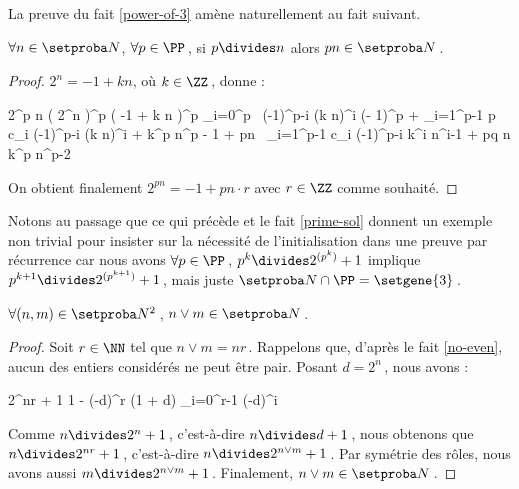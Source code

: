 La preuve du fait \ref{power-of-3} amène naturellement au fait suivant.

\begin{fact} \label{prime-divisor}
	$\forall n \in \ourset$, $\forall p \in \PP$\,,
	si $p \divides n$ alors $p n \in \ourset$\,.
\end{fact}

\begin{proof}
	$2^n = -1 + k n$, où $k \in \ZZ$\,, donne :

    \medskip
    
    \begin{stepcalc}[style=sar]
    	2^{p n}
    \explnext{}
    	\big( 2^n \big)^p
    \explnext{}
    	\big( -1 + k n \big)^p
    \explnext{}
    	\dsum_{i=0}^p  \, (-1)^{p-i} \cdot (k n)^i
    	(- 1)^p + \dsum_{i=1}^{p-1} p c_i \cdot (-1)^{p-i} \cdot (k n)^i + k^p \cdot n^p
    	- 1 + pn \, \dsum_{i=1}^{p-1} c_i \cdot (-1)^{p-i} \cdot k^i n^{i-1} + pq \cdot n \cdot k^p \cdot n^{p-2}
    \end{stepcalc}

    \medskip

    On obtient finalement $2^{p n} = - 1 + pn \cdot r$ avec $r \in \ZZ$ comme souhaité.
\end{proof}




Notons au passage que ce qui précède et le fait \ref{prime-sol} donnent un exemple non trivial pour insister sur la nécessité de l'initialisation dans une preuve par récurrence car nous avons
$\forall p \in \PP$\,, $p^k \divides 2^{( p^k )} + 1$ 
implique
$p^{k+1} \divides 2^{( p^{k+1} )} + 1$\,, mais juste $\ourset \cap \PP = \setgene{3}$\,.




\begin{fact} \label{lcm}
	$\forall (n , m) \in \ourset^2$\,, $n \vee m \in \ourset$\,.
\end{fact}

\begin{proof}
	Soit $r \in \NN$ tel que $n \vee m = n r$\,. Rappelons que, d'après le fait \ref{no-even}, aucun des entiers considérés ne peut être pair.
	Posant $d = 2^n$\,, nous avons :
	
	\medskip
	
	\begin{stepcalc}[style = ar*]
		2^{nr} + 1
		1 - (-d)^r
	\explnext{}
		(1 + d) \cdot \dsum_{i=0}^{r-1} (-d)^i
	\end{stepcalc}
	
	\medskip
	
	Comme $n \divides 2^n + 1$\,, c'est-à-dire $n \divides d + 1$\,, nous obtenons que $n \divides 2^{nr} + 1$\,, c'est-à-dire $n \divides 2^{n \vee m} + 1$\,.
	Par symétrie des rôles, nous avons aussi $m \divides 2^{n \vee m} + 1$\,.
	Finalement, $n \vee m \in \ourset$\,.
\end{proof}


